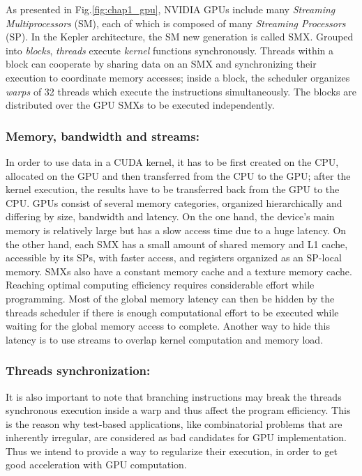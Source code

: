 As presented in Fig.\ref{fig:chap1_gpu}, NVIDIA GPUs include many \emph{Streaming Multiprocessors} (SM), each of which is composed of many \emph{Streaming Processors} (SP). In the Kepler architecture, the SM new generation is called SMX.
%
Grouped into \emph{blocks}, \textit{threads} execute \emph{kernel} functions synchronously.
Threads within a block can cooperate by sharing data on an SMX and synchronizing their execution to coordinate memory accesses; inside a block, the scheduler organizes \emph{warps} of 32 threads which execute the instructions simultaneously.
The blocks are distributed over the GPU SMXs to be executed independently.

\subsubsection{Memory, bandwidth and streams:}

In order to use data in a CUDA kernel, it has to be first created on the CPU, allocated on the GPU and then transferred from the CPU to the GPU; after the kernel execution, the results have to be transferred back from the GPU to the CPU. 
GPUs consist of several memory categories, organized hierarchically and differing by size, bandwidth and latency.   
On the one hand, the device's main memory is relatively large but has a slow access time due to a huge latency. 
On the other hand, each SMX has a small amount of shared memory and L1 cache, accessible by its SPs, with faster access, and registers organized as an SP-local memory. 
SMXs also have a constant memory cache and a texture memory cache.
Reaching optimal computing efficiency requires considerable effort while programming.
Most of the global memory latency can then be hidden by the threads scheduler if there is enough computational effort to be executed while waiting for the global memory access to complete. Another way to hide this latency is to use streams to overlap kernel computation and memory load. 

\subsubsection{Threads synchronization:}
It is also important to note that branching instructions may break the threads synchronous execution inside a warp and thus affect the program efficiency. 
This is the reason why test-based applications, like combinatorial problems that are inherently irregular, are considered as bad candidates for GPU implementation. 
Thus we intend to provide a way to regularize their execution, in order to get good acceleration with GPU computation. 

